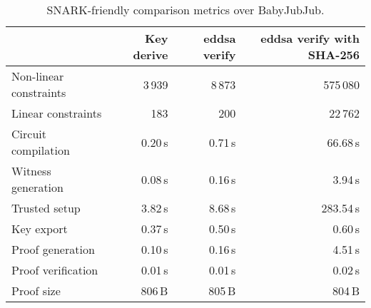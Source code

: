 \begin{table}[t]
	\centering
	\begin{tabular}{lrrr}
		\toprule
		& \textbf{Key derive} 
		& \textbf{\acrshort{eddsa} verify} 
		& \textbf{\acrshort{eddsa} verify with SHA-256} \\
		\midrule
		Non-linear constraints & 3\,939   & 8\,873    & 575\,080 \\
		Linear constraints     & 183      & 200      & 22\,762 \\
		\midrule
		Circuit compilation    & 0.20\,s  & 0.71\,s  & 66.68\,s \\
		Witness generation     & 0.08\,s  & 0.16\,s  & 3.94\,s \\
		Trusted setup          & 3.82\,s  & 8.68\,s  & 283.54\,s \\
		Key export             & 0.37\,s  & 0.50\,s  & 0.60\,s \\
		Proof generation       & 0.10\,s  & 0.16\,s  & 4.51\,s \\
		Proof verification     & 0.01\,s  & 0.01\,s  & 0.02\,s \\
		Proof size             & 806\,B   & 805\,B   & 804\,B \\
		\bottomrule
	\end{tabular}
	\caption{SNARK-friendly comparison metrics over BabyJubJub.}
	\label{tab:monolithic-native}
\end{table}
